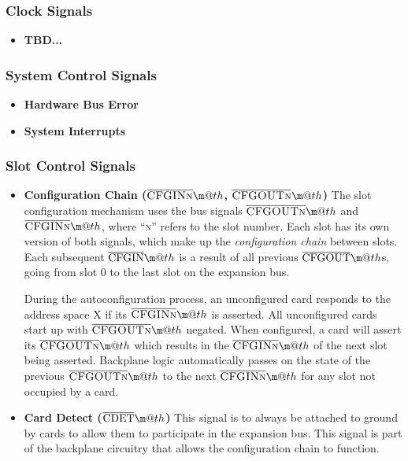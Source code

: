 \documentclass{article}
\makeatletter
\newcommand*{\textoverline}[1]{$\overline{\hbox{#1}}\m@th$}
\makeatother
\begin{document}
\subsubsection{Clock Signals}

\begin{itemize}
	\item{\textbf{TBD...}}
\end{itemize}

\subsubsection{System Control Signals}

\begin{itemize}
	\item{\textbf{Hardware Bus Error}}

	\item{\textbf{System Interrupts}}
\end{itemize}

\subsubsection{Slot Control Signals}

\begin{itemize}

	\item{\textbf{Configuration Chain
	(\textoverline{\scshape CFGINn},
	\textoverline{\scshape CFGOUTn})}} The slot configuration mechanism uses
	the bus signals \textoverline{\scshape CFGOUTn} and
	\textoverline{\scshape CFGINn}, where ``\textsc{n}'' refers to the slot
	number. Each slot has its own version of both signals, which make up the
	\textit{configuration chain} between slots. Each subsequent
	\textoverline{CFGIN} is a result of all previous
	\textoverline{CFGOUT}s, going from slot 0 to the last slot on the
	expansion bus.

	During the autoconfiguration process, an unconfigured card responds to
	the address space X if its \textoverline{\scshape CFGINn} is asserted.
	All unconfigured cards start up with \textoverline{\scshape CFGOUTn}
	negated. When configured, a card will assert its
	\textoverline{\scshape CFGOUTn} which results in the
	\textoverline{\scshape CFGINn} of the next slot being asserted.
	Backplane logic automatically passes on the state of the previous
	\textoverline{\scshape CFGOUTn} to the next
	\textoverline{\scshape CFGINn} for any slot not occupied by a card.

	\item{\textbf{Card Detect (\textoverline{CDET})}} This signal is to
	always be attached to ground by cards to allow them to participate in
	the expansion bus. This signal is part of the backplane circuitry that
	allows the configuration chain to function.

\end{itemize}
\end{document}
